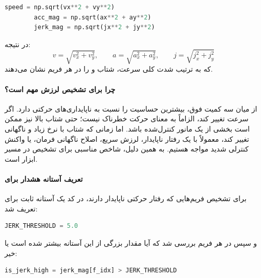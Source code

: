 \documentclass{article}
\begin{document}
\begin{latin}
	\begin{lstlisting}[language=Python, basicstyle=\ttfamily\scriptsize]
		speed = np.sqrt(vx**2 + vy**2)
		acc_mag = np.sqrt(ax**2 + ay**2)
		jerk_mag = np.sqrt(jx**2 + jy**2)
	\end{lstlisting}
\end{latin}

در نتیجه:
\[
v = \sqrt{v_x^2 + v_y^2}, \qquad
a = \sqrt{a_x^2 + a_y^2}, \qquad
j = \sqrt{j_x^2 + j_y^2}
\]
که به ترتیب شدت کلی سرعت، شتاب و  را در هر فریم نشان می‌دهند.

\paragraph{چرا  برای تشخیص لرزش مهم است؟}
از میان سه کمیت فوق،  بیشترین حساسیت را نسبت به ناپایداری‌های حرکتی دارد. اگر سرعت تغییر کند، الزاماً به معنای حرکت خطرناک نیست؛ حتی شتاب بالا نیز ممکن است بخشی از یک مانور کنترل‌شده باشد. اما زمانی که شتاب با نرخ زیاد و ناگهانی تغییر کند، معمولاً با یک رفتار ناپایدار، لرزش سریع، اصلاح ناگهانی فرمان، یا واکنش کنترلی شدید مواجه هستیم. به همین دلیل،  شاخص مناسبی برای تشخیص  در مسیر ابزار است.

\paragraph{تعریف آستانه هشدار برای }
برای تشخیص فریم‌هایی که رفتار حرکتی ناپایدار دارند، در کد یک آستانه ثابت برای  تعریف شد:

\begin{latin}
	\begin{lstlisting}[language=Python, basicstyle=\ttfamily\scriptsize]
		JERK_THRESHOLD = 5.0
	\end{lstlisting}
\end{latin}

و سپس در هر فریم بررسی شد که آیا مقدار بزرگی  از این آستانه بیشتر شده است یا خیر:

\begin{latin}
	\begin{lstlisting}[language=Python, basicstyle=\ttfamily\scriptsize]
		is_jerk_high = jerk_mag[f_idx] > JERK_THRESHOLD
	\end{lstlisting}
\end{latin}
\end{document}
